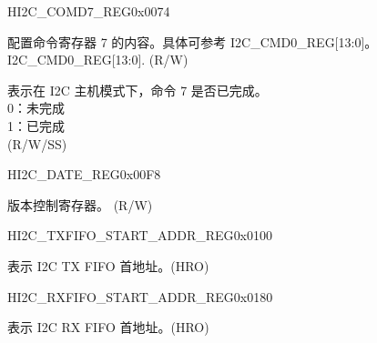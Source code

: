 \begin{register}{H}{I2C\_COMD7\_REG}{0x0074}\label{regdesc:I2CCOMD7REG}
%
%
%
\regnewline%
\begin{regdesc}\begin{reglist}
\label{fielddesc:I2CCOMMAND7}\item [I2C\_COMMAND7] 配置命令寄存器 7 的内容。具体可参考 I2C\_CMD0\_REG[13:0]。 I2C\_CMD0\_REG[13:0]. (R/W)
\label{fielddesc:I2CCOMMAND7DONE}\item [I2C\_COMMAND7\_DONE] 表示在 I2C 主机模式下，命令 7 是否已完成。\\
0：未完成\\
1：已完成  \\ (R/W/SS)
\end{reglist}\end{regdesc}
\end{register}


\begin{register}{H}{I2C\_DATE\_REG}{0x00F8}\label{regdesc:I2CDATEREG}
%
\regnewline%
\begin{regdesc}\begin{reglist}
\label{fielddesc:I2CDATE}\item [I2C\_DATE] 版本控制寄存器。 (R/W)
\end{reglist}\end{regdesc}
\end{register}


\begin{register}{H}{I2C\_TXFIFO\_START\_ADDR\_REG}{0x0100}\label{regdesc:I2CTXFIFOSTARTADDRREG}
%
\regnewline%
\begin{regdesc}\begin{reglist}
\label{fielddesc:I2CTXFIFOSTARTADDR}\item [I2C\_TXFIFO\_START\_ADDR] 表示 I2C TX FIFO 首地址。(HRO)
\end{reglist}\end{regdesc}
\end{register}


\begin{register}{H}{I2C\_RXFIFO\_START\_ADDR\_REG}{0x0180}\label{regdesc:I2CRXFIFOSTARTADDRREG}
%
\regnewline%
\begin{regdesc}\begin{reglist}
\label{fielddesc:I2CRXFIFOSTARTADDR}\item [I2C\_RXFIFO\_START\_ADDR] 表示 I2C RX FIFO 首地址。(HRO)
\end{reglist}\end{regdesc}
\end{register}
